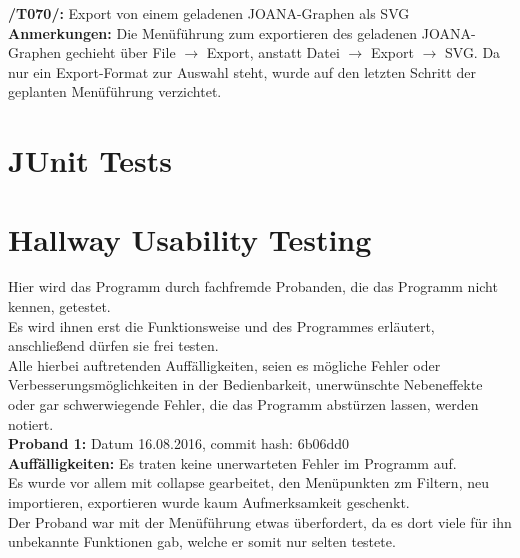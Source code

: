 \textbf{/T070/: }Export von einem geladenen JOANA-Graphen als SVG\\
\textbf{Anmerkungen: }Die Menüführung zum exportieren des geladenen JOANA-Graphen gechieht über \glqq{}File $\to$ Export\grqq, anstatt \glqq{}Datei $\to$ Export $\to$ SVG\grqq{}. Da nur ein Export-Format zur Auswahl steht, wurde auf den letzten Schritt der geplanten Menüführung verzichtet.\\


\section{JUnit Tests}


\section{Hallway Usability Testing}
Hier wird das Programm durch fachfremde Probanden, die das Programm nicht kennen, getestet.\\
Es wird ihnen erst die Funktionsweise und des Programmes erläutert, anschließend dürfen sie frei testen.\\
Alle hierbei auftretenden Auffälligkeiten, seien es mögliche Fehler oder Verbesserungsmöglichkeiten in der Bedienbarkeit, unerwünschte Nebeneffekte oder gar schwerwiegende Fehler, die das Programm abstürzen lassen, werden notiert.\\

\textbf{Proband 1: } Datum 16.08.2016, commit hash: 6b06dd0\\
\textbf{Auffälligkeiten: } Es traten keine unerwarteten Fehler im Programm auf.\\
Es wurde vor allem mit collapse gearbeitet, den Menüpunkten zm Filtern, neu importieren, exportieren wurde kaum Aufmerksamkeit geschenkt.\\
Der Proband war mit der Menüführung etwas überfordert, da es dort viele für ihn unbekannte Funktionen gab, welche er somit nur selten testete.

